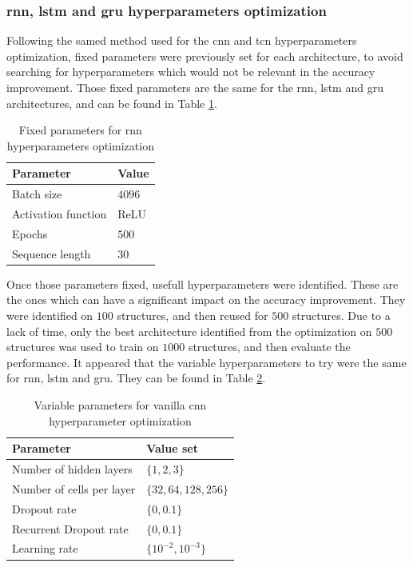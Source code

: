 \documentclass[conference]{IEEEtran}
\begin{document}
\subsubsection{\gls{rnn}, \gls{lstm} and \gls{gru} hyperparameters optimization}
Following the samed method used for the \gls{cnn} and \gls{tcn} hyperparameters optimization, fixed parameters were previously set for each architecture, to avoid searching for hyperparameters which would not be relevant in the accuracy improvement. Those fixed parameters are the same for the \gls{rnn}, \gls{lstm} and \gls{gru} architectures, and can be found in Table \ref{tab:fixed_parameters_rnn_optimization}.


\begin{table}[htp]
	\centering
	\caption{Fixed parameters for \gls{rnn} hyperparameters optimization}
	\label{tab:fixed_parameters_rnn_optimization}
	\begin{tabular}{ll}
		\textbf{Parameter} & \textbf{Value} \\
		\hline
		Batch size & $ 4096 $ \\
		Activation function & ReLU \\
		Epochs & $ 500 $ \\
		Sequence length & $ 30 $ 
	\end{tabular}
\end{table}


Once those parameters fixed, usefull hyperparameters were identified. These are the ones which can have a significant impact on the accuracy improvement. They were identified on $ 100 $ structures, and then reused for $ 500 $ structures. Due to a lack of time, only the best architecture identified from the optimization on $ 500 $ structures was used to train on $ 1000 $ structures, and then evaluate the performance. It appeared that the variable hyperparameters to try were the same for \gls{rnn}, \gls{lstm} and \gls{gru}. They can be found in Table \ref{tab:variable_parameters_rnn_optimization}.

\begin{table}[htp]
	\centering
	\caption{Variable parameters for vanilla \gls{cnn} hyperparameter optimization}
	\label{tab:variable_parameters_rnn_optimization}
	\begin{tabular}{ll}
		\textbf{Parameter} & \textbf{Value set} \\
		\hline
		Number of hidden layers & $ \{1, 2, 3\} $ \\
		Number of cells per layer & $ \{32, 64, 128, 256\} $ \\
		Dropout rate & $ \{0, 0.1\} $ \\
		Recurrent Dropout rate & $ \{0, 0.1\} $ \\
		Learning rate & $ \{10^{-2}, 10^{-3}\} $
	\end{tabular}
\end{table}
\end{document}

